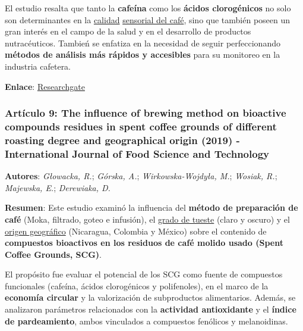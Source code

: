 \documentclass{article}
\begin{document}
El estudio resalta que tanto la \textbf{cafeína} como los \textbf{ácidos clorogénicos} no solo son determinantes en la \underline{calidad} \underline{sensorial del café}, sino que también poseen un gran interés en el campo de la salud y en el desarrollo de productos nutracéuticos. Tambień se enfatiza en la necesidad de seguir perfeccionando \textbf{métodos de análisis más rápidos y accesibles} para su monitoreo en la industria cafetera. \vspace{0.5cm}

\textbf{Enlace}: \href{https://www.researchgate.net/profile/Abebe-Gemta/publication/228467568_Some_biochemical_compounds_in_coffee_beans_and_methods_developed_for_their_analysis/links/65a79b2a47fc9041629d70c2/Some-biochemical-compounds-in-coffee-beans-and-methods-developed-for-their-analysis.pdf}{Researchgate} \vspace{0.5cm}

\subsubsection{\textbf{Artículo 9:} \textcolor{Cavern Pink}{\textbf{The influence of brewing method on bioactive compounds residues in spent coffee grounds of different roasting degree and geographical origin (2019) - International Journal of Food Science and Technology}}} \vspace{0.5cm}

\textbf{Autores}: \textit{Głowacka, R.}; \textit{Górska, A.}; \textit{Wirkowska-Wojdyła, M.}; \textit{Wosiak, R.}; \textit{Majewska, E.}; \textit{Derewiaka, D.} \vspace{0.5cm}

\textbf{Resumen}: Este estudio examinó la influencia del \textbf{método de preparación de café} (Moka, filtrado, goteo e infusión), el \underline{grado de tueste} (claro y oscuro) y el \underline{origen geográfico} (Nicaragua, Colombia y México) sobre el contenido de \textbf{compuestos bioactivos en los residuos de café molido usado (Spent Coffee Grounds, SCG)}.  

El propósito fue evaluar el potencial de los SCG como fuente de compuestos funcionales (cafeína, ácidos clorogénicos y polifenoles), en el marco de la \textbf{economía circular} y la valorización de subproductos alimentarios. Además, se analizaron parámetros relacionados con la \textbf{actividad antioxidante} y el \textbf{índice de pardeamiento}, ambos vinculados a compuestos fenólicos y melanoidinas. \vspace{0.5cm}
\end{document}
